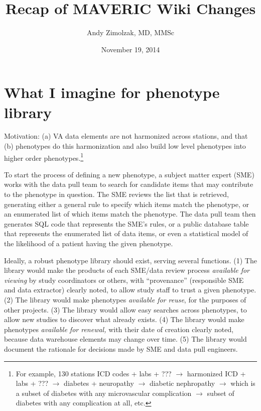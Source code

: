 \documentclass{tufte-handout}
\title{Recap of MAVERIC Wiki Changes}
\author{Andy Zimolzak, MD, MMSc}
\date{November 19, 2014}
\begin{document}
\maketitle

\section{What I imagine for phenotype library}

Motivation: (a) VA data elements are not harmonized across stations,
and that (b) phenotypes do this harmonization and also build low level
phenotypes into higher order phenotypes.\footnote{For example, 130
  stations ICD codes + labs + ??? $\to$ harmonized ICD + labs + ???
  $\to$ diabetes + neuropathy $\to$ diabetic nephropathy $\to$ which
  is a subset of diabetes with any microvascular complication $\to$
  subset of diabetes with any complication at all, etc.}

To start the process of defining a new phenotype, a subject matter
expert (SME) works with the data pull team to search for candidate
items that may contribute to the phenotype in question. The SME
reviews the list that is retrieved, generating either a general rule
to specify which items match the phenotype, or an enumerated list of
which items match the phenotype. The data pull team then generates SQL
code that represents the SME's rules, or a public database table that
represents the enumerated list of data items, or even a statistical
model of the likelihood of a patient having the given phenotype.

Ideally, a robust phenotype library should exist, serving several
functions. (1) The library would make the products of each SME/data
review process \emph{available for viewing} by study coordinators or
others, with ``provenance'' (responsible SME and data extractor)
clearly noted, to allow study staff to trust a given phenotype. (2)
The library would make phenotypes \emph{available for reuse}, for the
purposes of other projects. (3) The library would allow easy searches
across phenotypes, to allow new studies to discover what already
exists. (4) The library would make phenotypes \emph{available for
  renewal,} with their date of creation clearly noted, because data
warehouse elements may change over time. (5) The library would
document the rationale for decisions made by SME and data pull
engineers.%
\end{document}
